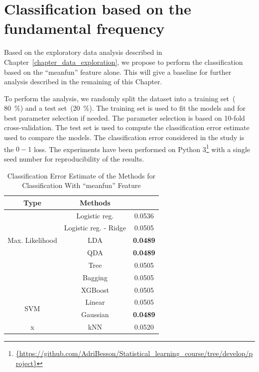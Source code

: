 \section{Classification based on the fundamental frequency}
\label{sec_intuitive_approach}
Based on the exploratory data analysis described in Chapter~\ref{chapter_data_exploration}, we propose to perform the classification based on the ``meanfun'' feature alone. 
This will give a baseline for further analysis described in the remaining of this Chapter.

To perform the analysis, we randomly split the dataset into a training set~( \SI{80}{\percent}) and a test set~(\SI{20}{\percent}). 
The training set is used to fit the models and for best parameter selection if needed. The parameter selection is based on \num{10}-fold cross-validation. The test set is used to compute the classification error estimate used to compare the models. The classification error considered in the study is the $0-1$ loss. 
The experiments have been performed on Python \num{3}\footnote{\url{{https://github.com/AdriBesson/Statistical_learning_course/tree/develop/project}}} with a single seed number for reproducibility of the results.
\begin{table}[htb]
	\caption{Classification Error Estimate of the Methods for Classification With ``meanfun'' Feature}
	\begin{center}
		\begin{tabular}{@{} c c c @{}}\toprule
			Type & Methods & \\
			\midrule
			\multirow{5}{*}{Max. Likelihood} & Logistic reg. & \num{0.0536} \\
			& Logistic reg. - Ridge & \num{0.0505}  \\
			& LDA & \textbf{\num{0.0489}} \\
			& QDA & \textbf{\num{0.0489}} \\
			\cmidrule{1-3}
			\multirow{3}{*}{Trees} & Tree & \num{0.0505} \\
			& Bagging & \num{0.0505} \\
			& XGBoost & \num{0.0505}\\
			\cmidrule{1-3}
			\multirow{2}{*}{SVM} & Linear & \num{0.0505} \\
			& Gaussian & \textbf{\num{0.0489}} \\
			\cmidrule{1-3}
			x & kNN & \num{0.0520}\\
			\bottomrule
		\end{tabular}
	\end{center}
	\label{tab_res_meanfun}
\end{table}

